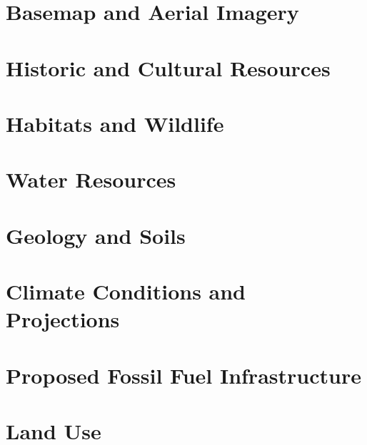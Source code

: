\section{Basemap and Aerial Imagery}
\label{sec:Basemap}


\section{Historic and Cultural Resources}
\label{sec:Historic}


\section{Habitats and Wildlife}
\label{sec:Habitats}


\section{Water Resources}
\label{sec:Water Resources}


\section{Geology and Soils}
\label{sec:Geology}


\section{Climate Conditions and Projections}
\label{sec:Climate}


\section{Proposed Fossil Fuel Infrastructure}
\label{sec:fossil}


\section{Land Use}
\label{sec:Landuse}


